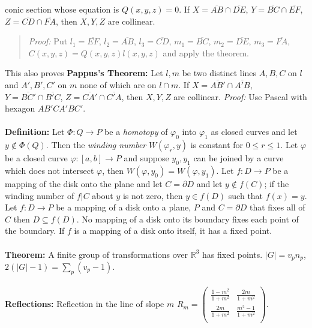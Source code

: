 conic section whose equation is $Q(x,y,z)=0$.  If 
$X= {\overline {AB}} \cap  {\overline {DE}}$,
$Y= {\overline {BC}} \cap  {\overline {EF}}$,
$Z= {\overline {CD}} \cap  {\overline {FA}}$, then $X, Y, Z$ are collinear.  
\begin{quote}
\emph{Proof:}
Put
$l_1 = {\overline {EF}}$,
$l_2 = {\overline {AB}}$,
$l_3 = {\overline {CD}}$,
$m_1 = {\overline {BC}}$,
$m_2 = {\overline {DE}}$,
$m_3 = {\overline {FA}}$, $C(x,y,z)= Q(x,y,z)l(x,y,z)$ and apply the theorem. 
\end{quote}
This also proves {\bf Pappus's Theorem:} Let $l, m$ be two distinct lines $A,B,C$ on $l$ and
$A', B', C'$ on $m$ none of which are on $l \cap m$.  If
$X= {\overline {AB'}} \cap  {\overline {A' B}}$,
$Y= {\overline {BC'}} \cap  {\overline {B'C}}$,
$Z= {\overline {CA'}} \cap  {\overline {C'A}}$, then $X, Y, Z$ are collinear.  \emph{Proof:}
Use Pascal with hexagon $AB'CA'BC'$.
\\
\\
{\bf Definition:}
Let $\Phi: Q \rightarrow P$ be a \emph{homotopy} of $\varphi_0$ into $\varphi_1$ as closed
curves and let $y \notin \Phi(Q)$.  Then the \emph{winding number}
$W(\varphi_r, y)$ is constant
for $0 \le r \le 1$.  Let $\varphi$ be a closed curve $\varphi: [a,b] \rightarrow P$ and
suppose $y_0 , y_1$ can be joined by a curve which does not intersect $\varphi$, then
$W(\varphi, y_0 )= W(\varphi , y_1)$.  Let $f: D \rightarrow P$ be a mapping of
the disk onto the plane and let $C= \partial D$ and let $y \notin f(C)$;
if the winding number
of $f|C$ about $y$ is not zero, then $y \in f(D)$ such that $f(x)=y$.
Let $f: D \rightarrow P$ be a mapping of a disk onto a plane, $P$ and $C= \partial D$
that fixes all of $C$ then $D \subseteq f(D)$.  No mapping of a disk onto its boundary
fixes each point of the boundary.  If $f$ is a mapping of a disk onto itself, it has
a fixed point. 
\\
\\
{\bf Theorem:}
A finite group of transformations over ${\mathbb R}^3$ has fixed points. $|G|= v_p n_p$,
$2(|G| -1) = \sum_p (v_p - 1)$.
\\
\\
{\bf Reflections:}  Reflection in the line of slope $m$
$R_m = 
\left(
\begin{array}{cc}
{\frac {1 - m^2} {1+m^2}} & {\frac {2 m} {1+m^2}} \\
{\frac {2 m} {1+m^2}} & {\frac {m^2 - 1} {1+m^2}} \\
\end{array}
\right)$. \\
